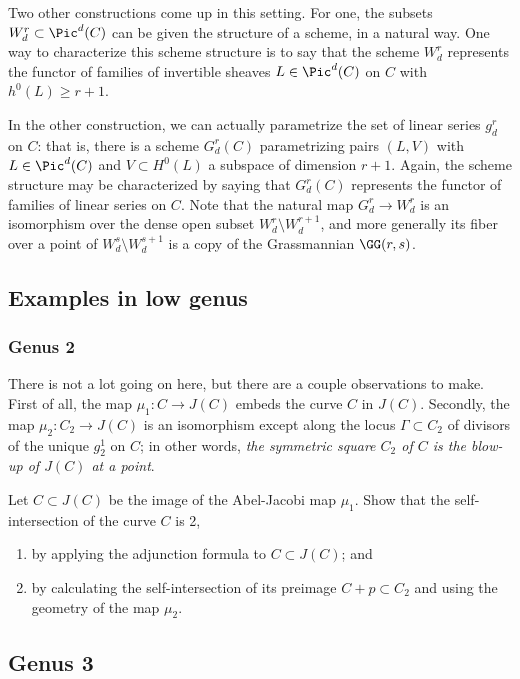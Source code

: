 Two other constructions come up in this setting. For one, the subsets $W^r_d \subset \Pic^d(C)$ can be given the structure of a scheme, in a natural way. One way to characterize this scheme structure is to say that the scheme $W^r_d$ represents the functor of families of invertible sheaves $L \in \Pic^d(C)$ on $C$ with  $h^0(L) \geq r+1$.

In the other construction, we can actually parametrize the set of linear series $g^r_d$ on $C$: that is, there is a scheme  $G^r_d(C)$ parametrizing pairs $(L, V)$ with $L \in \Pic^d(C)$ and $V \subset H^0(L)$ a subspace of dimension $r+1$. Again, the scheme structure may be characterized by saying that $G^r_d(C)$ represents the functor of families of linear series on $C$. Note that the natural map $G^r_d \to W^r_d$ is an isomorphism over the dense open subset $W^r_d \setminus W^{r+1}_d$, and more generally its fiber over a point of $W^s_d \setminus W^{s+1}_d$ is a copy of  the Grassmannian $\GG(r, s)$. 



\subsection{Examples in low genus}

\subsubsection{Genus 2} There is not a lot going on here, but there are a couple observations to make. First of all, the map $\mu_1 : C \to J(C)$ embeds the curve $C$ in $J(C)$. Secondly, the map $\mu_2 : C_2 \to J(C)$ is an isomorphism except along the locus $\Gamma \subset C_2$ of divisors of the unique $g^1_2$ on $C$; in other words, \emph{the symmetric square $C_2$ of $C$ is the blow-up of $J(C)$ at a point}.

\begin{exercise}
Let $C \subset J(C)$ be the image of the Abel-Jacobi map $\mu_1$. Show that the self-intersection of the curve $C$ is 2,
\begin{enumerate}
\item by applying the adjunction formula to $C \subset J(C)$; and
\item by calculating the self-intersection of its preimage $C + p \subset C_2$ and using the geometry of the map $\mu_2$.
\end{enumerate}
\end{exercise}

\subsection{Genus 3}



